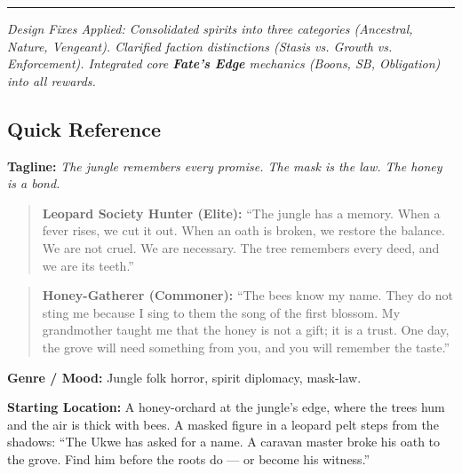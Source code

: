 \vspace{1cm}
\hrule
\vspace{0.5cm}
\noindent\emph{Design Fixes Applied: Consolidated spirits into three categories (Ancestral, Nature, Vengeant). Clarified faction distinctions (Stasis vs. Growth vs. Enforcement). Integrated core \textbf{Fate's Edge} mechanics (Boons, SB, Obligation) into all rewards.}

\subsection*{Quick Reference}
\textbf{Tagline:} \textit{The jungle remembers every promise. The mask is the law. The honey is a bond.}

\begin{quote}
  \textbf{Leopard Society Hunter (Elite):}  
  ``The jungle has a memory. When a fever rises, we cut it out. When an oath is broken, we restore the balance. We are not cruel. We are necessary. The tree remembers every deed, and we are its teeth.''
\end{quote}

\begin{quote}
  \textbf{Honey-Gatherer (Commoner):}  
  ``The bees know my name. They do not sting me because I sing to them the song of the first blossom. My grandmother taught me that the honey is not a gift; it is a trust. One day, the grove will need something from you, and you will remember the taste.''
\end{quote}

\textbf{Genre / Mood:} Jungle folk horror, spirit diplomacy, mask-law.

\textbf{Starting Location:} A honey-orchard at the jungle's edge, where the trees hum and the air is thick with bees. A masked figure in a leopard pelt steps from the shadows: ``The Ukwe has asked for a name. A caravan master broke his oath to the grove. Find him before the roots do --- or become his witness.''

